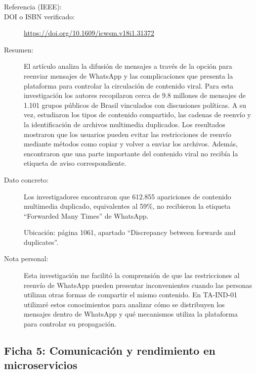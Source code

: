 \begin{description}

\item[Referencia (IEEE):]

\item[DOI o ISBN verificado:]
\url{https://doi.org/10.1609/icwsm.v18i1.31372}

\item[Resumen:]
El artículo analiza la difusión de mensajes a través de la opción para reenviar mensajes de WhatsApp y las complicaciones que presenta la plataforma para controlar la circulación de contenido viral. Para esta investigación los autores recopilaron cerca de 9.8 millones de mensajes de 1.101 grupos públicos de Brasil vinculados con discusiones políticas. A su vez, estudiaron los tipos de contenido compartido, las cadenas de reenvío y la identificación de archivos multimedia duplicados. Los resultados mostraron que los usuarios pueden evitar las restricciones de reenvío mediante métodos como copiar y volver a enviar los archivos. Además, encontraron que una parte importante del contenido viral no recibía la etiqueta de aviso correspondiente.

\item[Dato concreto:]
Los investigadores encontraron que 612.855 apariciones de contenido multimedia duplicado, equivalentes al 59\%, no recibieron la etiqueta ``Forwarded Many Times'' de WhatsApp.

Ubicación: página 1061, apartado ``Discrepancy between forwards and duplicates''.

\item[Nota personal:]
Esta investigación me facilitó la comprensión de que las restricciones al reenvío de WhatsApp pueden presentar inconvenientes cuando las personas utilizan otras formas de compartir el mismo contenido. En TA-IND-01 utilizaré estos conocimientos para analizar cómo se distribuyen los mensajes dentro de WhatsApp y qué mecanismos utiliza la plataforma para controlar su propagación.

\end{description}



\subsection{Ficha 5: Comunicación y rendimiento en microservicios}

